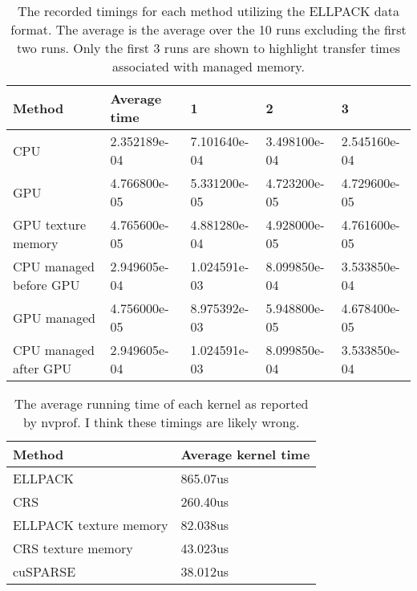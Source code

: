 \documentclass{article}
\begin{document}
\begin{table}[] 
  \centering 
  \begin{tabular}{|l|l|l|l|l|} 
    \hline Method                 & Average time & 1            & 2            & 3 \\
    \hline CPU                    & 2.352189e-04 & 7.101640e-04 & 3.498100e-04 & 2.545160e-04 \\
    \hline GPU                    & 4.766800e-05 & 5.331200e-05 & 4.723200e-05 & 4.729600e-05 \\
    \hline GPU texture memory     & 4.765600e-05 & 4.881280e-04 & 4.928000e-05 & 4.761600e-05 \\
    \hline CPU managed before GPU & 2.949605e-04 & 1.024591e-03 & 8.099850e-04 & 3.533850e-04 \\
    \hline GPU managed            & 4.756000e-05 & 8.975392e-03 & 5.948800e-05 & 4.678400e-05 \\
    \hline CPU managed after GPU  & 2.949605e-04 & 1.024591e-03 & 8.099850e-04 & 3.533850e-04 \\ \hline
  \end{tabular}

  \caption{The recorded timings for each method utilizing the ELLPACK data
    format.  The average is the average over the 10 runs excluding the first two
    runs.  Only the first 3 runs are shown to highlight transfer times associated
  with managed memory.} 
\end{table}

\begin{table}[] 
  \centering 
  \begin{tabular}{|l|l|} 
    \hline Method                 & Average kernel time \\
    \hline ELLPACK                & 865.07us \\
    \hline CRS                    & 260.40us \\
    \hline ELLPACK texture memory & 82.038us \\
    \hline CRS texture memory     & 43.023us \\
    \hline cuSPARSE               & 38.012us \\ \hline
  \end{tabular}
  \caption{The average running time of each
    kernel as reported by nvprof. I think these
  timings are likely wrong.}
\end{table}
\end{document}
